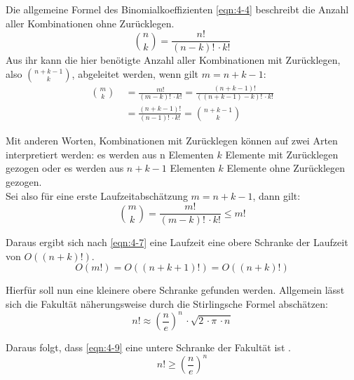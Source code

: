 Die allgemeine Formel des Binomialkoeffizienten \eqref{eqn:4-4} beschreibt die Anzahl aller Kombinationen ohne Zurücklegen. 
\begin{equation} \label{eqn:4-4}
\tag{4-4}
\binom{n}{k} = \frac{n!}{(n-k)!\, \cdotp k!}
\end{equation} 
Aus ihr kann die hier benötigte Anzahl aller Kombinationen mit Zurücklegen, also  $ \binom{n + k - 1}{k} $, abgeleitet werden, wenn gilt $ m = n + k - 1 $:
\begin{equation} \label{eqn:4-5}
\tag{4-5}
\begin{aligned}
\binom{m}{k} &\ {} = \frac{m!}{(m - k)!\, \cdotp k!} 
= \frac{(n+k-1)!}{((n+k-1)-k)!\, \cdotp k!} \\
&\ = \frac{(n+k-1)!}{(n-1)!\, \cdotp k!} 
= \binom{n + k - 1}{k}
\end{aligned}
\end{equation}

Mit anderen Worten, Kombinationen mit Zurücklegen können auf zwei Arten interpretiert werden: es werden aus n Elementen $ k $ Elemente mit Zurücklegen gezogen oder es werden aus $ n + k - 1 $ Elementen $ k $ Elemente ohne Zurücklegen gezogen. \\

Sei also für eine erste Laufzeitabschätzung $ m = n + k - 1 $, dann gilt:
\begin{equation} \label{eqn:4-6}
\tag{4-6}
\binom{m}{k} = \frac{m!}{(m - k)!\, \cdotp k!} \leq m!
\end{equation} 

Daraus ergibt sich nach \eqref{eqn:4-7} eine Laufzeit eine obere Schranke der Laufzeit von \linebreak $ O((n + k)!) $. 
\begin{equation} \label{eqn:4-7}
\tag{4-7}
O(m!) = O((n + k + 1)!) = O((n + k)!)
\end{equation} 

Hierfür soll nun eine kleinere obere Schranke gefunden werden. Allgemein lässt sich die Fakultät näherungsweise durch die Stirlingsche Formel \cite{bronst} abschätzen:
\begin{equation} \label{eqn:4-8}
\tag{4-8}
n! \approx \left( \frac{n}{e} \right) ^n \, \cdotp \sqrt{2 \, \cdotp \pi \, \cdotp n}
\end{equation} 

Daraus folgt, dass \eqref{eqn:4-9} eine untere Schranke der Fakultät ist \cite{script_binom}.
\begin{equation} \label{eqn:4-9}
\tag{4-9}
n! \geq \left( \frac{n}{e} \right) ^n 
\end{equation} 

